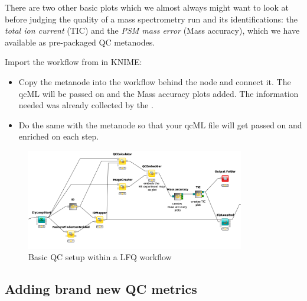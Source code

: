 There are two other basic plots which we almost always might want to look at before judging the quality of a mass spectrometry run and its identifications: the \textit{total ion current} (TIC) and the \textit{PSM mass error} (Mass accuracy), which we have available as pre-packaged QC metanodes.
\begin{task}
Import the workflow from  in KNIME: 
\end{task}
\begin{itemize}
\item Copy the  metanode into the workflow behind the  node and connect it. The qcML will be passed on and the Mass accuracy plots added. The information needed was already collected by the .
\item Do the same with the  metanode so that your qcML file will get passed on and enriched on each step. 
\end{itemize}
\begin{figure}[htbp]
  \centering
  \includegraphics[width=0.85\textwidth]{graphics/qc/qc_basic}
  \caption{Basic QC setup within a LFQ workflow}
  \label{fig:qc_basic}
\end{figure}



\subsection{Adding brand new QC metrics}
\label{Adding brand new QC metrics}

